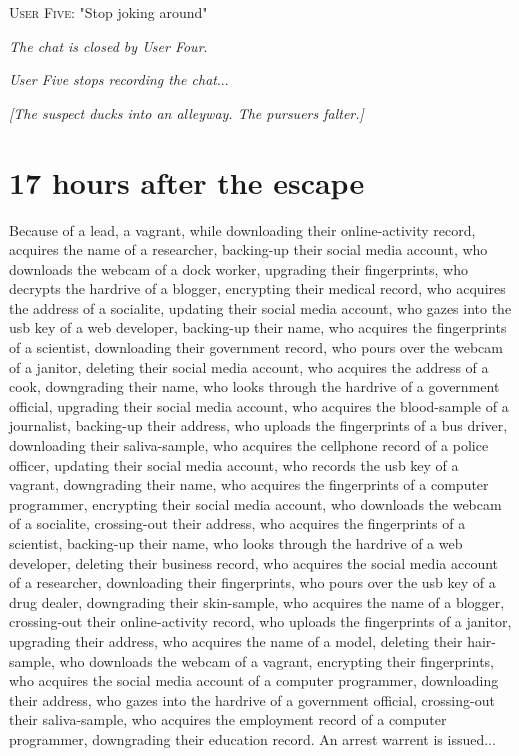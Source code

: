 \documentclass{report}
\begin{document}
\textsc{User Five}: "Stop joking around" 

\textit{The chat is closed by User Four}. 

\textit{User Five stops recording the chat}...

\textit{[The suspect ducks into an alleyway. The pursuers falter.]}


\section*{17 \small{hours after the escape}}

Because of a lead, a vagrant, while downloading their online-activity record, acquires the name of a researcher, backing-up their social media account, who downloads the webcam of a dock worker, upgrading their fingerprints, who decrypts the hardrive of a blogger, encrypting their medical record, who acquires the address of a socialite, updating their social media account, who gazes into the usb key of a web developer, backing-up their name, who acquires the fingerprints of a scientist, downloading their government record, who pours over the webcam of a janitor, deleting their social media account, who acquires the address of a cook, downgrading their name, who looks through the hardrive of a government official, upgrading their social media account, who acquires the blood-sample of a journalist, backing-up their address, who uploads the fingerprints of a bus driver, downloading their saliva-sample, who acquires the cellphone record of a police officer, updating their social media account, who records the usb key of a vagrant, downgrading their name, who acquires the fingerprints of a computer programmer, encrypting their social media account, who downloads the webcam of a socialite, crossing-out their address, who acquires the fingerprints of a scientist, backing-up their name, who looks through the hardrive of a web developer, deleting their business record, who acquires the social media account of a researcher, downloading their fingerprints, who pours over the usb key of a drug dealer, downgrading their skin-sample, who acquires the name of a blogger, crossing-out their online-activity record, who uploads the fingerprints of a janitor, upgrading their address, who acquires the name of a model, deleting their hair-sample, who downloads the webcam of a vagrant, encrypting their fingerprints, who acquires the social media account of a computer programmer, downloading their address, who gazes into the hardrive of a government official, crossing-out their saliva-sample, who acquires the employment record of a computer programmer, downgrading their education record. An arrest warrent is issued...
\end{document}
